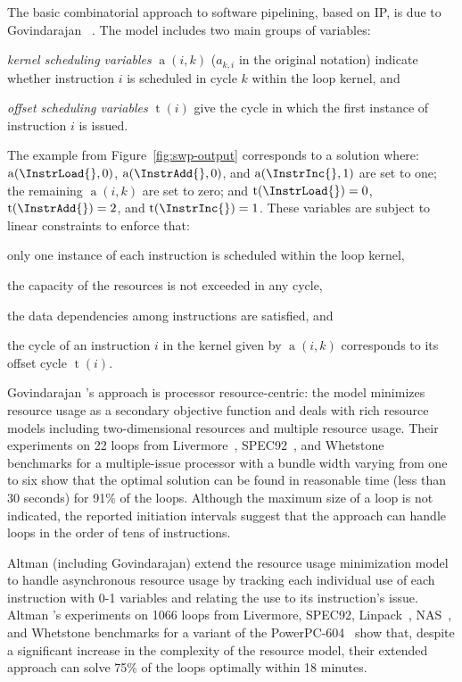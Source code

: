 \documentclass[acmsmall,authorversion,nonacm]{acmart}
\newcommand{\noMathVar}[2]{\operatorname{#1}(#2)}
\newcommand{\var}[2]{$\noMathVar{#1}{#2}$}
\begin{document}
The basic combinatorial approach to software pipelining, based on IP,
is due to Govindarajan \etal{}~\cite{Govindarajan1994}.
The model includes two main groups of variables:
\begin{inparaitem}[]
\item \emph{kernel scheduling variables} \var{a}{i,k} ($a_{k,i}$ in
  the original notation) indicate whether instruction $i$ is scheduled
  in cycle $k$ within the loop kernel, and
\item \emph{offset scheduling variables} \var{t}{i} give the cycle
  in which the first instance of instruction $i$ is issued.
\end{inparaitem}
The example from Figure~\ref{fig:swp-output} corresponds to a solution
where: \var{a}{\InstrLoad{},0}, \var{a}{\InstrAdd{},0}, and
\var{a}{\InstrInc{},1} are set to one; the remaining \var{a}{i,k} are
set to zero; and $\noMathVar{t}{\InstrLoad{}} = 0$,
$\noMathVar{t}{\InstrAdd{}} = 2$, and $\noMathVar{t}{\InstrInc{}} =
1$.
These variables are subject to linear constraints to enforce that:
\begin{inparaitem}[]
\item only one instance of each instruction is scheduled within the
  loop kernel,
\item the capacity of the resources is not exceeded in any cycle,
\item the data dependencies among instructions are satisfied, and
\item the cycle of an instruction $i$ in the kernel given by
  \var{a}{i,k} corresponds to its offset cycle \var{t}{i}.
\end{inparaitem}
Govindarajan \etal{}'s approach is processor resource-centric: the
model minimizes resource usage as a secondary objective function and
deals with rich resource models including two-dimensional resources
and multiple resource usage.
Their experiments on 22 loops from Livermore~\cite{McMahon1986},
SPEC92~\cite{CPU}, and Whetstone~\cite{Curnow1976} benchmarks for a
multiple-issue processor with a bundle width varying from one to six
show that the optimal solution can be found in reasonable time (less
than 30 seconds) for 91\% of the loops.
Although the maximum size of a loop is not indicated, the reported
initiation intervals suggest that the approach can handle loops in
the order of tens of instructions.


Altman \etal{} (including Govindarajan) extend the resource usage
minimization model~\cite{Altman1995} to handle asynchronous resource
usage by tracking each individual use of each instruction with 0-1
variables and relating the use to its instruction's issue.
Altman \etal{}'s experiments on 1066 loops from Livermore, SPEC92,
Linpack~\cite{Dongarra2003}, NAS~\cite{Bailey1985}, and Whetstone
benchmarks for a variant of the PowerPC-604~\cite{Diefendorff1994}
show that, despite a significant increase in the complexity of the
resource model, their extended approach can solve 75\% of the loops
optimally within 18 minutes.
\end{document}
